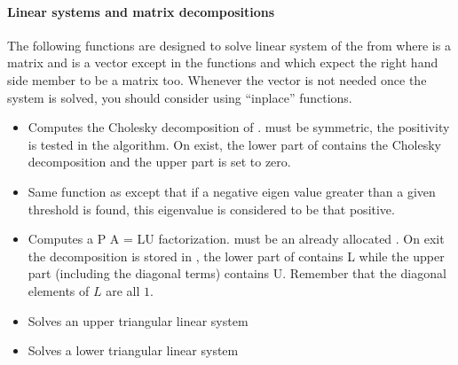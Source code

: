 \paragraph{Linear systems and matrix decompositions}

The following functions are designed to solve linear system of the from  where  is a matrix and  is a vector except in the
functions  and 
which expect the right hand side member to be a matrix too. Whenever the
vector  is not needed once the system is solved, you should consider
using ``inplace'' functions.

\begin{itemize}
\item {}
  \sshortdescribe Computes the Cholesky decomposition of .  must
  be symmetric, the positivity is tested in the algorithm. On exist, the lower
  part of  contains the Cholesky decomposition and the upper part is
  set to zero.

\item {}
  \sshortdescribe Same function as  except that if a negative
  eigen value greater than a given threshold is found, this eigenvalue is
  considered to be that positive.

\item {} 
  \sshortdescribe Computes a P A = LU factorization.  must be an
  already allocated  . On exit the decomposition is
  stored in , the lower part of  contains L while the upper part
  (including the diagonal terms) contains U. Remember that the diagonal
  elements of $L$ are all $1$.


\item {}
  \sshortdescribe Solves an upper triangular linear system 

\item {}
  \sshortdescribe Solves a lower triangular linear system  
  


\end{itemize}
